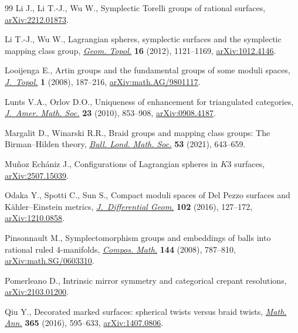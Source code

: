 \begin{thebibliography}{99}
Li J., Li T.-J., Wu W., Symplectic {T}orelli groups of rational surfaces,
 \href{http://arxiv.org/abs/2212.01873}{arXiv:2212.01873}.

Li T.-J., Wu W., Lagrangian spheres, symplectic surfaces and the symplectic
 mapping class group,
 \href{https://doi.org/10.2140/gt.2012.16.1121}{\textit{Geom. Topol.}}
 \textbf{16} (2012), 1121--1169,
 \href{http://arxiv.org/abs/1012.4146}{arXiv:1012.4146}.

Looijenga E., Artin groups and the fundamental groups of some moduli spaces,
 \href{https://doi.org/10.1112/jtopol/jtm009}{\textit{J.~Topol.}} \textbf{1}
 (2008), 187--216,
 \href{http://arxiv.org/abs/math.AG/9801117}{arXiv:math.AG/9801117}.

Lunts V.A., Orlov D.O., Uniqueness of enhancement for triangulated categories,
 \href{https://doi.org/10.1090/S0894-0347-10-00664-8}{\textit{J.~Amer. Math.
 Soc.}} \textbf{23} (2010), 853--908,
 \href{http://arxiv.org/abs/0908.4187}{arXiv:0908.4187}.

Margalit D., Winarski R.R., Braid groups and mapping class groups: {T}he
 {B}irman--{H}ilden theory,
 \href{https://doi.org/10.1112/blms.12456}{\textit{Bull. Lond. Math. Soc.}}
 \textbf{53} (2021), 643--659.

Mu\~noz Ech\'aniz J., Configurations of {L}agrangian spheres in {$K3$}
 surfaces, \href{http://arxiv.org/abs/2507.15039}{arXiv:2507.15039}.

Odaka Y., Spotti C., Sun S., Compact moduli spaces of {D}el {P}ezzo surfaces
 and {K}\"{a}hler--{E}instein metrics,
 \href{https://doi.org/10.4310/jdg/1452002879}{\textit{J.~Differential Geom.}}
 \textbf{102} (2016), 127--172,
 \href{http://arxiv.org/abs/1210.0858}{arXiv:1210.0858}.

Pinsonnault M., Symplectomorphism groups and embeddings of balls into rational
 ruled 4-manifolds,
 \href{https://doi.org/10.1112/S0010437X0700334X}{\textit{Compos. Math.}}
 \textbf{144} (2008), 787--810,
 \href{http://arxiv.org/abs/math.SG/0603310}{arXiv:math.SG/0603310}.

Pomerleano D., Intrinsic mirror symmetry and categorical crepant resolutions,
 \href{http://arxiv.org/abs/2103.01200}{arXiv:2103.01200}.

Qiu Y., Decorated marked surfaces: spherical twists versus braid twists,
 \href{https://doi.org/10.1007/s00208-015-1339-0}{\textit{Math. Ann.}}
 \textbf{365} (2016), 595--633,
 \href{http://arxiv.org/abs/1407.0806}{arXiv:1407.0806}.


\end{thebibliography}
